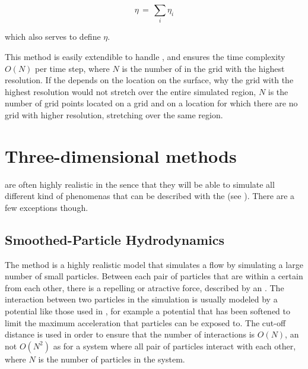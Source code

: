 \begin{equation} \label{eq:laplacian_pyramid_composition}
\eta \,=\, \sum_i \eta_i
\end{equation}

which also serves to define $\eta$.

This method is easily extendible to handle \FSI, and ensures the time complexity $O(N)$ per time step, where $N$ is the number of  in the grid with the highest resolution. If the  depends on the location on the surface, why the grid with the highest resolution would not stretch over the entire simulated region, $N$ is the number of grid points located on a grid and on a location for which there are no grid with higher resolution, stretching over the same region.

\section{Three-dimensional methods}

 are often highly realistic in the sence that they will be able to simulate all different kind of phenomenas that can be described with the  (see ). There are a few exceptions though.

\subsection{Smoothed-Particle Hydrodynamics}

The \SPH method is a highly realistic model that simulates a flow by simulating a large number of small particles. Between each pair of particles that are within a certain  from each other, there is a repelling or atractive force, described by an \ODE. The interaction between two particles in the simulation is usually modeled by a potential like those used in \MD, for example a \LJ potential that has been softened to limit the maximum acceleration that particles can be exposed to. The cut-off distance is used in order to ensure that the number of interactions is $O(N)$, an not $O(N^2)$ as for a system where all pair of particles interact with each other, where $N$ is the number of particles in the system.


